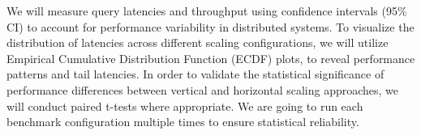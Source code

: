 \documentclass{article}
\begin{document}
We will measure query latencies and throughput using confidence
intervals (95\% CI) to account for performance variability in distributed
systems. 
To visualize the distribution of latencies across different scaling
configurations, we will utilize Empirical Cumulative Distribution Function
(ECDF) plots, to reveal performance patterns and tail latencies.
In order to validate the statistical significance of performance differences
between vertical and horizontal scaling approaches, we will conduct paired
t-tests where appropriate.
We are going to run each benchmark configuration multiple times to ensure 
statistical reliability.
\end{document}
